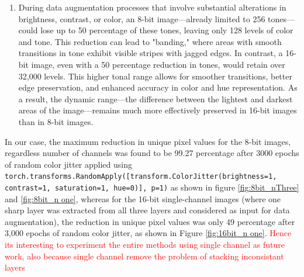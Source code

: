 \begin{enumerate}
\item During data augmentation processes that involve substantial alterations in brightness, contrast, or color, an 8-bit image—already limited to 256 tones—could lose up to 50 percentage of these tones, leaving only 128 levels of color and tone. This reduction can lead to "banding," where areas with smooth transitions in tone exhibit visible stripes with jagged edges. In contrast, a 16-bit image, even with a 50 percentage reduction in tones, would retain over 32,000 levels. This higher tonal range allows for smoother transitions, better edge preservation, and enhanced accuracy in color and hue representation. As a result, the dynamic range—the difference between the lightest and darkest areas of the image—remains much more effectively preserved in 16-bit images than in 8-bit images.
\end{enumerate}
In our case, the maximum reduction in unique pixel values for the 8-bit images, regardless number of channels was found to be 99.27 percentage after 3000 epochs of random
color jitter applied  using \texttt{torch.transforms.RandomApply([transform.ColorJitter(brightness=1, contrast=1, saturation=1, hue=0)], p=1)} 
as shown in figure \ref{fig:8bit_nThree} and \ref{fig:8bit_n one}, whereas for the 16-bit single-channel images (where one sharp layer was extracted from all three layers and considered as input for data augmentation), the reduction in unique pixel values was only 49 percentage after 3,000 epochs of random color jitter, as shown in Figure \ref{fig:16bit_n one}.
\textcolor{red}{Hence its interesting to experiment the entire methods using single channel as future work, also because single channel remove the 
problem of stacking inconsistant layers}



